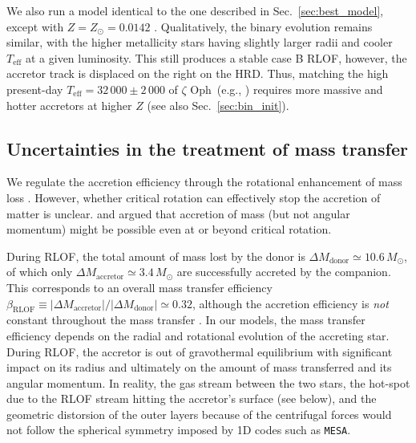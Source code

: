 \documentclass[twocolumn,twocolappendix,trackchanges]{aastex63}
\DeclareRobustCommand{\Secref}[1]{Sec.~\ref{#1}}
\newcommand{\zoph}{$\zeta$ Oph}
\begin{document}
We also run a model identical to the one described in
\Secref{sec:best_model}, except with $Z=Z_\odot=0.0142$
\citep{asplund:09}. Qualitatively, the binary evolution remains
similar, with the higher metallicity stars having slightly larger
radii and cooler $T_\mathrm{eff}$ at a given luminosity. This still
produces a stable case B RLOF, however, the accretor track is
displaced on the right on the HRD. Thus, matching the high present-day
$T_\mathrm{eff}=32\,000\pm2\,000$ of \zoph\ (e.g., ) requires more
massive and hotter accretors at higher $Z$ (see also \Secref{sec:bin_init}).


\subsection{Uncertainties in the treatment of mass transfer}
\label{sec:bin_param}

We regulate the accretion efficiency through the rotational
enhancement of mass loss \citep[e.g.,][]{langer:98}.
However, whether critical rotation can effectively stop the accretion
of matter is unclear. \cite{popham:91} and \cite{paczynski:91}
argued that accretion of mass (but not angular momentum) might be
possible even at or beyond critical rotation.

During RLOF, the total amount of mass lost by the donor is
$\Delta M_\mathrm{donor} \simeq 10.6\,M_\odot$, of which only
$\Delta M_\mathrm{accretor}\simeq 3.4\,M_\odot$ are successfully
accreted by the companion. This corresponds to an overall mass transfer efficiency
$\beta_\mathrm{RLOF}\equiv |\Delta M_\mathrm{accretor}|/|\Delta M_\mathrm{donor}| \simeq 0.32$,
although the accretion efficiency is \emph{not} constant throughout
the mass transfer \citep[e.g.,][]{vanrensbergen:06}. In our models,
the mass transfer efficiency depends on the radial and rotational
evolution of the accreting star. During RLOF, the accretor is out of
gravothermal equilibrium with significant impact on its radius and
ultimately on the amount of mass transferred and its angular
momentum. In reality, the gas stream between the two stars, the
hot-spot due to the RLOF stream hitting the accretor's surface (see below), and
the geometric distorsion of the outer layers because of the
centrifugal forces would not follow the spherical symmetry imposed by
1D codes such as \texttt{MESA}.
\end{document}

